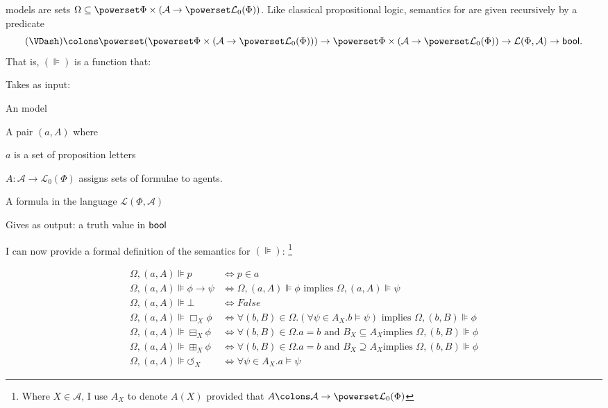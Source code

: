   models are sets $\Omega
\subseteq \powerset \Phi \times ( \mathcal{A} \rightarrow \powerset
\mathcal{L}_0 (\Phi))$.  Like classical propositional logic, semantics for
 are given recursively by a predicate
\[ (\VDash) \colons \powerset ( \powerset \Phi \times ( \mathcal{A}
   \rightarrow \powerset \mathcal{L}_0 (\Phi))) \rightarrow \powerset \Phi
   \times ( \mathcal{A} \rightarrow \powerset \mathcal{L}_0 (\Phi))
   \rightarrow \mathcal{L} (\Phi, \mathcal{A}) \rightarrow
   \textup{\textsf{bool}}. \]
That is, $(\VDash)$ is a function that:
\begin{itemizedot}
  \item Takes as input:
\begin{itemizedot}
  \item An \evil model
  
  \item A pair $(a, A)$ where
  \begin{itemizedot}
    \item $a$ is a set of proposition letters
    
    \item $A:\mathcal{A}\to \mathcal{L}_0 (\Phi)$ assigns sets of formulae to agents.
  \end{itemizedot}
  \item A formula in the language $\mathcal{L} (\Phi, \mathcal{A})$
  \end{itemizedot}
  \item Gives as output: a truth value in $\textup{\textsf{bool}}$
\end{itemizedot}
I can now provide a formal definition of the semantics for $(\VDash)$:
{\footnote{Where $X \in \mathcal{A}$, I
use $A_X$ to denote $A (X)$ provided that $A \colons \mathcal{A} \rightarrow
\powerset \mathcal{L}_0 (\Phi)$}}
\begin{definition}
\begin{align*}
  {\Omega},(a,A){\VDash} p & {\iff}p{\in}a\\
  {\Omega},(a,A){\VDash} {\phi}{\rightarrow}{\psi} &
  {\iff}{\Omega},(a,A){\VDash}{\phi}\text{ implies
  }{\Omega},(a,A){\VDash}{\psi}\\
  {\Omega},(a,A){\VDash}{\bot} & {\iff} False\\
  {\Omega},(a,A){\VDash}\Box_X {\phi} & {\iff}{\forall}(b,B){\in}{\Omega}.
  ({\forall}{\psi}{\in}A_X. b{\models}{\psi})\text{ implies
  }{\Omega},(b,B){\VDash}{\phi}\\
  {\Omega},(a,A){\VDash}{\boxminus}_X{\phi} &
  {\iff}{\forall}(b,B){\in}{\Omega}. a=b\text{ and }B_X{\subseteq}A_X\text{
  implies }{\Omega},(b,B){\VDash}{\phi}\\
  {\Omega},(a,A){\VDash}{\boxplus}_X{\phi} &
  {\iff}{\forall}(b,B){\in}{\Omega}. a=b\text{ and }B_X{\supseteq}A_X\text{
  implies }{\Omega},(b,B){\VDash}{\phi}\\
  {\Omega},(a,A){\VDash}{\circlearrowleft}_X & {\iff}
  {\forall}{\psi}{\in}A_X.a{\models}{\psi}
\end{align*}
\end{definition}
